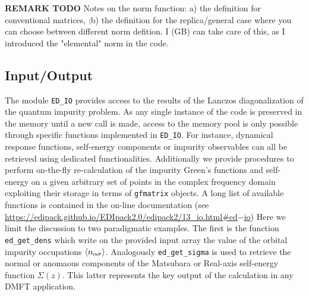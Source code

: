 \documentclass[edipack2.tex]{subfiles}
\begin{document}
{\bf REMARK TODO}
Notes on the norm function: a) the definition for conventional
matrices, ;b) the definition for the replica/general case where you
can choose between different norm defition.
{\color{red} I (GB) can take care of this, as I introduced the "elemental" norm in the code.}



\subsection{Input/Output}\label{sSecIO}
The module {\tt ED\_IO} provides access to the results of the Lanczos
diagonalization of the quantum impurity problem.
As any single instance of the code is preserved in the memory until a
new call is made, access to the memory pool is only possible through
specific functions implemented in {\tt ED\_IO}. For instance, dynamical response functions, self-energy components or impurity
observables can all be retrieved using dedicated functionalities.
Additionally we provide procedures to perform on-the-fly
re-calculation of the impurity Green's functions and self-energy on a
given arbitrary set of points in the complex frequency domain
exploiting their storage in terms of {\tt gfmatrix} objects.
A long list of available functions is contained in the on-line
documentation (see
\href{https://edipack.github.io/EDIpack2.0/edipack2/13_io.html#ed-io}{https://edipack.github.io/EDIpack2.0/edipack2/13\_io.html\#ed$-$io})
Here we limit the discussion to two paradigmatic examples.
The first is the function {\tt ed\_get\_dens} which write on the
provided input array the value of the orbital impurity occupations
$\langle n_{\alpha\sigma}\rangle$. Analogously {\tt ed\_get\_sigma} is used to
retrieve the normal or anomaous components of the Matsubara or
Real-axis self-energy function $\Sigma(z)$. This latter represents the
key output of the calculation in 
any DMFT application. 
\end{document}
